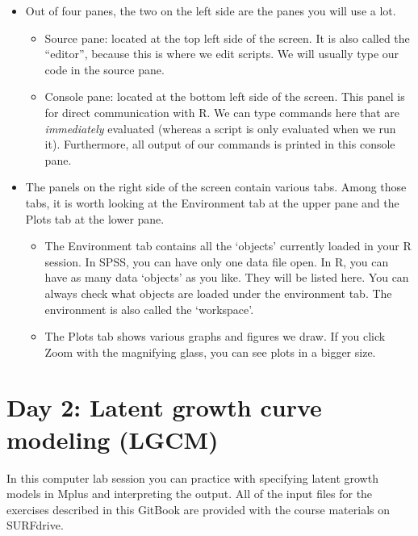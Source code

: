 \documentclass[
]{book}
\providecommand{\tightlist}{%
  \setlength{\itemsep}{0pt}\setlength{\parskip}{0pt}}
\begin{document}
\begin{itemize}
\tightlist
\item
  Out of four panes, the two on the left side are the panes you will use a lot.

  \begin{itemize}
  \tightlist
  \item
    Source pane: located at the top left side of the screen. It is also called the ``editor'', because this is where we edit scripts. We will usually type our code in the source pane.
  \item
    Console pane: located at the bottom left side of the screen. This panel is for direct communication with R. We can type commands here that are \emph{immediately} evaluated (whereas a script is only evaluated when we run it). Furthermore, all output of our commands is printed in this console pane.
  \end{itemize}
\item
  The panels on the right side of the screen contain various tabs. Among those tabs, it is worth looking at the Environment tab at the upper pane and the Plots tab at the lower pane.

  \begin{itemize}
  \tightlist
  \item
    The Environment tab contains all the `objects' currently loaded in your R session. In SPSS, you can have only one data file open. In R, you can have as many data `objects' as you like. They will be listed here. You can always check what objects are loaded under the environment tab. The environment is also called the `workspace'.
  \item
    The Plots tab shows various graphs and figures we draw. If you click Zoom with the magnifying glass, you can see plots in a bigger size.
  \end{itemize}
\end{itemize}

\hypertarget{day-2-latent-growth-curve-modeling-lgcm}{%
\chapter{Day 2: Latent growth curve modeling (LGCM)}\label{day-2-latent-growth-curve-modeling-lgcm}}

In this computer lab session you can practice with specifying latent growth models in Mplus and interpreting the output. All of the input files for the exercises described in this GitBook are provided with the course materials on SURFdrive.
\end{document}

